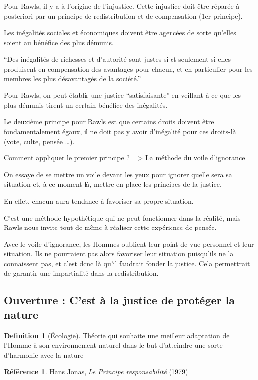 \documentclass[french]{book}
\theoremstyle{definition}
\newtheorem*{dfn}{Definition}
\newtheorem*{refe}{Référence}
\begin{document}
Pour Rawls, il y a à l’origine de l’injustice. Cette injustice doit être réparée à posteriori par un principe de redistribution et de compensation (1er principe).

Les inégalités sociales et économiques doivent être agencées de sorte qu'elles soient au bénéfice des plus démunis.

“Des inégalités de richesses et d’autorité sont justes si et seulement si elles produisent en compensation des avantages pour chacun, et en particulier pour les membres les plus désavantagés de la société.”

Pour Rawls, on peut établir une justice “satisfaisante” en veillant à ce que les plus démunis tirent un certain bénéfice des inégalités.

Le deuxième principe pour Rawls est que certains droits doivent être fondamentalement égaux, il ne doit pas y avoir d’inégalité pour ces droits-là (vote, culte, pensée …).

Comment appliquer le premier principe ? => La méthode du voile d’ignorance

On essaye de se mettre un voile devant les yeux pour ignorer quelle sera sa situation et, à ce moment-là, mettre en place  les principes de la justice.

En effet, chacun aura tendance à favoriser sa propre situation.

C’est une méthode hypothétique qui ne peut fonctionner dans la réalité, mais Rawls nous invite tout de même à réaliser cette expérience de pensée.

Avec le voile d’ignorance, les Hommes oublient leur point de vue personnel et leur situation. Ils ne pourraient pas alors favoriser leur situation puisqu’ils ne la connaissent pas, et c’est donc là qu’il faudrait fonder la justice. Cela permettrait de garantir une impartialité dans la redistribution.

\subsection{Ouverture : C’est à la justice de protéger la nature}

\begin{dfn}[Écologie]
	Théorie qui souhaite une meilleur adaptation de l’Homme à son environnement naturel dans le but d’atteindre une sorte d’harmonie avec la nature
\end{dfn}


\begin{refe}
	Hans Jonas, \textit{Le Principe responsabilité} (1979)
\end{refe}
\end{document}
